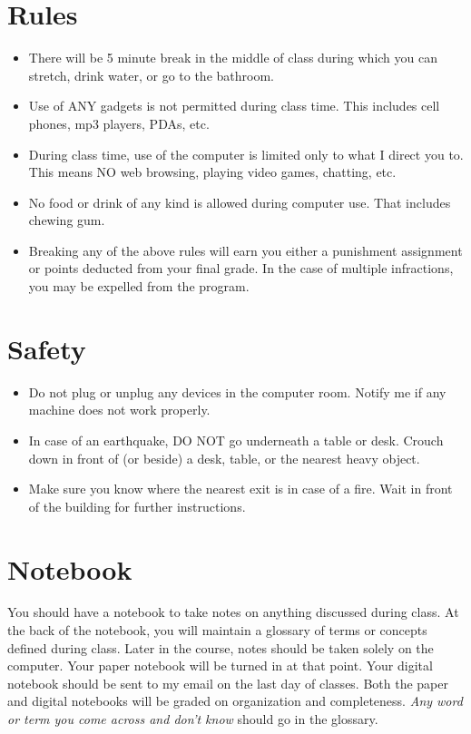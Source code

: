 \documentclass[11pt]{article}
\begin{document}
\section{Rules}

\begin{itemize}
\item There will be 5 minute break in the middle of class during which you can stretch, drink water, or go to the bathroom.
\item Use of ANY gadgets is not permitted during class time.  This includes cell phones, mp3 players, PDAs, etc.
\item During class time, use of the computer is limited only to what I direct you to.  This means NO web browsing, playing video games, chatting, etc.
\item No food or drink of any kind is allowed during computer use.  That includes chewing gum.
\item Breaking any of the above rules will earn you either a punishment assignment or points deducted from your final grade.  In the case of multiple infractions, you may be expelled from the program.
\end{itemize}

\section{Safety}

\begin{itemize}
\item Do not plug or unplug any devices in the computer room.  Notify me if any machine does not work properly.
\item In case of an earthquake, DO NOT go underneath a table or desk.  Crouch down in front of (or beside) a desk, table, or the nearest heavy object.
\item Make sure you know where the nearest exit is in case of a fire.  Wait in front of the building for further instructions.
\end{itemize}


\section{Notebook}

You should have a notebook to take notes on anything discussed during class.  At the back of the notebook, you will maintain a glossary of terms or concepts defined during class.  Later in the course, notes should be taken solely on the computer.  Your paper notebook will be turned in at that point.  Your digital notebook should be sent to my email on the last day of classes.  Both the paper and digital notebooks will be graded on organization and completeness.  \emph{Any word or term you come across and don't know} should go in the glossary.
\end{document}
